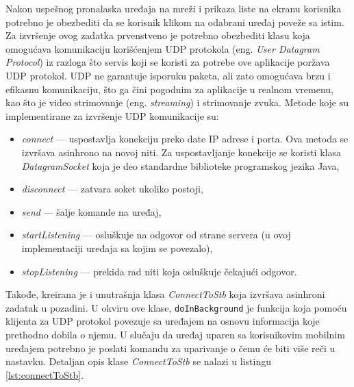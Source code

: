 \documentclass[struktura.tex]{subfiles}
\begin{document}
Nakon uspešnog pronalaska uređaja na mreži i prikaza liste na ekranu korisnika potrebno je obezbediti da se korisnik klikom na odabrani uređaj poveže sa istim. Za izvršenje ovog zadatka prvenstveno je potrebno obezbediti klasu koja omogućava komunikaciju korišćenjem UDP protokola (eng. \textit{User Datagram Protocol}) iz razloga što servis koji se koristi za potrebe ove aplikacije poržava UDP protokol. UDP ne garantuje isporuku paketa, ali zato omogućava brzu i efikasnu komunikaciju, što ga čini pogodnim za aplikacije u realnom vremenu, kao što je video strimovanje (eng. \textit{streaming}) i strimovanje zvuka. Metode koje su implementirane za izvršenje UDP komunikacije su:
\begin{itemize}
    \item \textit{connect} --- uspostavlja konekciju preko date IP adrese i porta. Ova metoda se izvršava asinhrono na novoj niti. Za uspostavljanje konekcije se koristi klasa \textit{DatagramSocket} koja je deo standardne biblioteke programskog jezika Java, 
    \item \textit{disconnect} --- zatvara soket ukoliko postoji,
    \item \textit{send} --- šalje komande na uređaj,
    \item \textit{startListening} --- osluškuje na odgovor od strane servera (u ovoj implementaciji uređaja sa kojim se povezalo),
    \item \textit{stopListening} --- prekida rad niti koja osluškuje čekajući odgovor.
    
\end{itemize}


Takođe, kreirana je i unutrašnja klasa \textit{ConnectToStb} koja izvršava asinhroni zadatak u pozadini. U okviru ove klase, \verb|doInBackground| je funkcija koja pomoću klijenta za UDP protokol povezuje sa uređajem na osnovu informacija koje prethodno dobila o njemu. U slučaju da uređaj uparen sa korisnikovim mobilnim uređajem potrebno je poslati komandu za uparivanje o čemu će biti više reči u nastavku. Detaljan opis klase \textit{ConnectToStb} se nalazi u listingu \ref{lst:connectToStb}.


\end{document}
